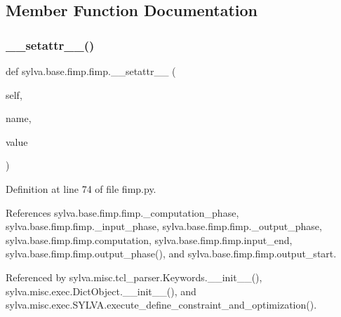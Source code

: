 \subsection{Member Function Documentation}
\mbox{\label{classsylva_1_1base_1_1fimp_1_1fimp_a4668ff17373340003362fa266b97efe4}} 
\subsubsection{\texorpdfstring{\+\_\+\+\_\+setattr\+\_\+\+\_\+()}{\_\_setattr\_\_()}}
{\footnotesize\ttfamily def sylva.\+base.\+fimp.\+fimp.\+\_\+\+\_\+setattr\+\_\+\+\_\+ (\begin{DoxyParamCaption}\item[{}]{self,  }\item[{}]{name,  }\item[{}]{value }\end{DoxyParamCaption})}



Definition at line 74 of file fimp.\+py.



References sylva.\+base.\+fimp.\+fimp.\+\_\+computation\+\_\+phase, sylva.\+base.\+fimp.\+fimp.\+\_\+input\+\_\+phase, sylva.\+base.\+fimp.\+fimp.\+\_\+output\+\_\+phase, sylva.\+base.\+fimp.\+fimp.\+computation, sylva.\+base.\+fimp.\+fimp.\+input\+\_\+end, sylva.\+base.\+fimp.\+fimp.\+output\+\_\+phase(), and sylva.\+base.\+fimp.\+fimp.\+output\+\_\+start.



Referenced by sylva.\+misc.\+tcl\+\_\+parser.\+Keywords.\+\_\+\+\_\+init\+\_\+\+\_\+(), sylva.\+misc.\+exec.\+Dict\+Object.\+\_\+\+\_\+init\+\_\+\+\_\+(), and sylva.\+misc.\+exec.\+S\+Y\+L\+V\+A.\+execute\+\_\+define\+\_\+constraint\+\_\+and\+\_\+optimization().


